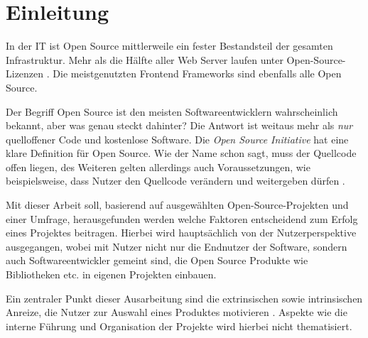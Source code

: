 \chapter{Einleitung}



In der IT ist Open Source mittlerweile ein fester Bestandsteil der gesamten Infrastruktur.
Mehr als die Hälfte aller Web Server laufen unter Open-Source-Lizenzen \cite{W3Techs_WebServer}.
Die meistgenutzten Frontend Frameworks sind ebenfalls alle Open Source. \cite{StackOverflowSurvey2021}


Der Begriff Open Source ist den meisten Softwareentwicklern wahrscheinlich bekannt,
aber was genau steckt dahinter? Die Antwort ist weitaus mehr als \textit{nur} quelloffener Code
und kostenlose Software.
Die \textit{Open Source Initiative} hat eine klare Definition für Open Source.
Wie der Name schon sagt, muss der Quellcode offen liegen, des Weiteren gelten allerdings auch
Voraussetzungen, wie beispielsweise, dass Nutzer den Quellcode verändern und weitergeben
dürfen \cite{OpenSourceDefinition}.


Mit dieser Arbeit soll, basierend auf ausgewählten Open-Source-Projekten und einer Umfrage,
herausgefunden werden welche Faktoren entscheidend zum Erfolg eines Projektes beitragen.
Hierbei wird hauptsächlich von der Nutzerperspektive ausgegangen, wobei mit Nutzer nicht nur die
Endnutzer der Software, sondern auch Softwareentwickler gemeint sind, die Open Source Produkte wie
Bibliotheken etc. in eigenen Projekten einbauen.

Ein zentraler Punkt dieser Ausarbeitung sind die extrinsischen sowie intrinsischen Anreize,
die Nutzer zur Auswahl eines Produktes motivieren \cite{midhaFactorsAffectingSuccess2012}. %
Aspekte wie die interne Führung und Organisation der Projekte wird hierbei nicht thematisiert.




